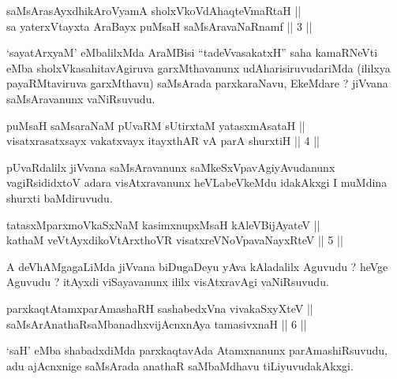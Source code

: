
\begin{shl}
saMsArasAyxdhikAroV\s yamA sholxVkoVdAhaqteVmaRtaH || \\
sa yaterxVtayxta AraBayx puMsaH saMsAravaNaRnamf \hfill || 3 ||
  
\end{shl}

\begin{artha}
`sayatArxyaM' eMbalilxMda AraMBisi ``tadeVvasakatxH'' saha kamaRNeVti
eMba sholxVkasahitavAgiruva garxMthavanunx udAharisiruvudariMda
(ililxya payaRMtaviruva garxMthavu) saMsArada parxkaraNavu,
EkeMdare ? jiVvana saMsAravanunx vaNiRsuvudu.
\end{artha}


\begin{shl}
puMsaH saMsaraNaM pUvaRM sUtirxtaM yatasxmAsataH || \\
visatxrasatxsayx vakatxvayx itayxthAR vA parA shurxtiH \hfill || 4 ||
  
\end{shl}

\begin{artha}
pUvaRdalilx jiVvana saMsAravanunx saMkeSxVpavAgiyAvudanunx
vagiRsididxtoV adara visAtxravanunx heVLabeVkeMdu idakAkxgi I muMdina
shurxti baMdiruvudu.
\end{artha}

\begin{shl}
tatasxMparxmoVkaSxNaM kasimxnupxMsaH kAleV\s BijAyateV || \\
kathaM veVtAyxdikoV\s tArxthoVR visatxreVNoVpavaNayxRteV \hfill || 5 ||
  
\end{shl}

\begin{artha}
A deVhAMgagaLiMda jiVvana biDugaDeyu yAva kAladalilx Aguvudu ? heVge
Aguvudu ? itAyxdi viSayavanunx ililx visAtxravAgi vaNiRsuvudu.
\end{artha}

\begin{shl}
parxkaqtAtamxparAmashaRH sashabedxVna vivakaSxyXteV || \\
saMsArAnathaRsaMbanadhxvijAcnxnAya tamasivxnaH \hfill || 6 ||
  
\end{shl}

\begin{artha}
`saH' eMba shabadxdiMda parxkaqtavAda Atamxnanunx parAmashiRsuvudu,
adu ajAcnxnige saMsArada anathaR saMbaMdhavu tiLiyuvudakAkxgi.
\end{artha}


